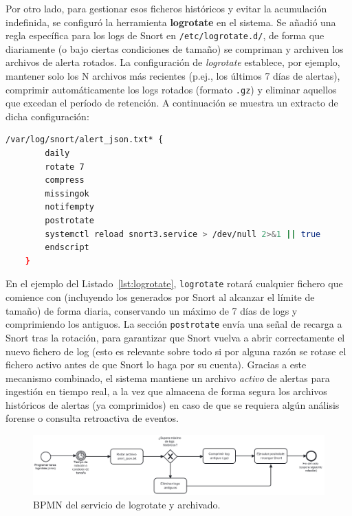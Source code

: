 \documentclass[11pt,a4paper,twoside]{report}
\begin{document}
Por otro lado, para gestionar esos ficheros históricos y evitar la acumulación indefinida, se configuró la herramienta \textbf{logrotate} en el sistema. Se añadió una regla específica para los logs de Snort en \texttt{/etc/logrotate.d/}, de forma que diariamente (o bajo ciertas condiciones de tamaño) se compriman y archiven los archivos de alerta rotados. La configuración de \textit{logrotate} establece, por ejemplo, mantener solo los N archivos más recientes (p.ej., los últimos 7 días de alertas), comprimir automáticamente los logs rotados (formato \texttt{.gz}) y eliminar aquellos que excedan el período de retención. A continuación se muestra un extracto de dicha configuración:

\newpage

\begin{lstlisting}[language=bash, caption={Regla de logrotate para los logs de Snort}, label={lst:logrotate}]
	/var/log/snort/alert_json.txt* {
		daily
		rotate 7
		compress
		missingok
		notifempty
		postrotate
		systemctl reload snort3.service > /dev/null 2>&1 || true
		endscript
	}
\end{lstlisting}

En el ejemplo del Listado~\ref{lst:logrotate}, \texttt{logrotate} rotará cualquier fichero que comience con  (incluyendo los generados por Snort al alcanzar el límite de tamaño) de forma diaria, conservando un máximo de 7 días de logs y comprimiendo los antiguos. La sección \texttt{postrotate} envía una señal de recarga a Snort tras la rotación, para garantizar que Snort vuelva a abrir correctamente el nuevo fichero de log (esto es relevante sobre todo si por alguna razón se rotase el fichero activo antes de que Snort lo haga por su cuenta). Gracias a este mecanismo combinado, el sistema mantiene un archivo \textit{activo} de alertas para ingestión en tiempo real, a la vez que almacena de forma segura los archivos históricos de alertas (ya comprimidos) en caso de que se requiera algún análisis forense o consulta retroactiva de eventos.

\begin{figure}[H]
	\centering
	\includegraphics[width=1\textwidth]{documento/25.png}
	\caption{BPMN del servicio de logrotate y archivado.}
	\label{fig:bpmn-logrotate}
\end{figure}
\end{document}
